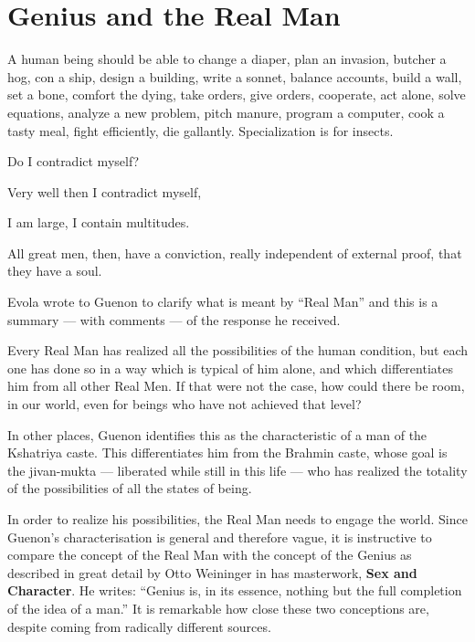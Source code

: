 \section{Genius and the Real Man}

\begin{quotex}
A human being should be able to change a diaper, plan an invasion, butcher a hog, con a ship, design a building, write a sonnet, balance accounts, build a wall, set a bone, comfort the dying, take orders, give orders, cooperate, act alone, solve equations, analyze a new problem, pitch manure, program a computer, cook a tasty meal, fight efficiently, die gallantly. Specialization is for insects. 

Do I contradict myself?

Very well then I contradict myself,

I am large, I contain multitudes.


All great men, then, have a conviction, really independent of external proof, that they have a soul.


\end{quotex}
Evola wrote to Guenon to clarify what is meant by “Real Man” and this is a summary — with comments — of the response he received.

\begin{quotex}
Every Real Man has realized all the possibilities of the human condition, but each one has done so in a way which is typical of him alone, and which differentiates him from all other Real Men. If that were not the case, how could there be room, in our world, even for beings who have not achieved that level?

\end{quotex}
In other places, Guenon identifies this as the characteristic of a man of the Kshatriya caste. This differentiates him from the Brahmin caste, whose goal is the jivan-mukta — liberated while still in this life — who has realized the totality of the possibilities of all the states of being.

In order to realize his possibilities, the Real Man needs to engage the world. Since Guenon's characterisation is general and therefore vague, it is instructive to compare the concept of the Real Man with the concept of the Genius as described in great detail by Otto Weininger in has masterwork, \textbf{Sex and Character}. He writes: “Genius is, in its essence, nothing but the full completion of the idea of a man.” It is remarkable how close these two conceptions are, despite coming from radically different sources.

